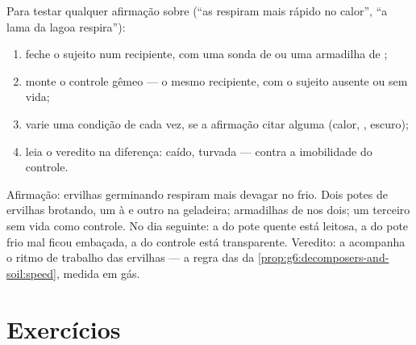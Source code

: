 \begin{method}\label{met:g7:what-is-respiration:test}
Para testar qualquer afirmação sobre  (``as  respiram
mais rápido no calor'', ``a lama da lagoa respira''):
\begin{enumerate}
  \item feche o sujeito num recipiente, com uma sonda de  ou
        uma armadilha de ;
  \item monte o controle gêmeo --- o mesmo recipiente, com o sujeito
        ausente ou sem vida;
  \item varie uma condição de cada vez, se a afirmação citar alguma
        (calor, , escuro);
  \item leia o veredito na diferença:  caído, 
        turvada --- contra a imobilidade do controle.
\end{enumerate}
\end{method}

\begin{example}\label{ex:g7:what-is-respiration:coldseed}
Afirmação: ervilhas germinando respiram mais devagar no frio. Dois
potes de ervilhas brotando, um à   e outro na
geladeira; armadilhas de  nos dois; um terceiro sem vida
como controle. No dia seguinte: a  do pote quente está
leitosa, a do pote frio mal ficou embaçada, a do controle está
transparente. Veredito: a  acompanha o ritmo de trabalho das
ervilhas --- a regra das  da
\cref{prop:g6:decomposers-and-soil:speed}, medida em gás.
\end{example}

\section{Exercícios}

